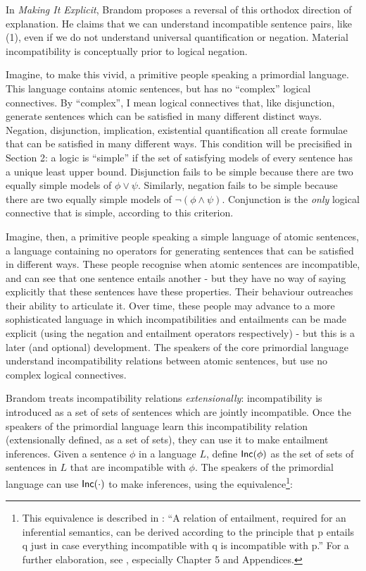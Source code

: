 \NI In \emph{Making It Explicit}\cite{brandom2}, Brandom proposes a reversal of this
orthodox direction of explanation.  He claims that we can understand
incompatible sentence pairs, like (1), even if we do not understand
universal quantification or negation.  Material incompatibility is
conceptually prior to logical negation.

\NI Imagine, to make this vivid, a primitive people speaking a
primordial language.  This language contains atomic sentences, but has
no ``complex'' logical connectives.  By ``complex'', I mean logical
connectives that, like disjunction, generate sentences which can be
satisfied in many different distinct ways.  Negation, disjunction,
implication, existential quantification all create formulae that can
be satisfied in many different ways. This condition will be
precisified in Section 2: a logic is ``simple'' if the set of
satisfying models of every sentence has a unique least upper
bound. Disjunction fails to be simple because there are two equally
simple models of $\phi \lor \psi$. Similarly, negation fails to be simple
because there are two equally simple models of $\neg (\phi \land
\psi)$. Conjunction is the \emph{only} logical connective that is simple,
according to this criterion.

\NI Imagine, then, a primitive people speaking a simple language of
atomic sentences, a language containing no operators for generating
sentences that can be satisfied in different ways.  These people
recognise when atomic sentences are incompatible, and can see that one
sentence entails another - but they have no way of saying explicitly
that these sentences have these properties.  Their behaviour
outreaches their ability to articulate it.  Over time, these people
may advance to a more sophisticated language in which
incompatibilities and entailments can be made explicit (using the
negation and entailment operators respectively) - but this is a later
(and optional) development. The speakers of the core primordial
language understand incompatibility relations between atomic
sentences, but use no complex logical connectives.

Brandom treats incompatibility relations \emph{extensionally}:
incompatibility is introduced as a set of sets of sentences which are
jointly incompatible.  Once the speakers of the primordial language
learn this incompatibility relation (extensionally defined, as a set
of sets), they can use it to make entailment inferences.  Given a
sentence $\phi$ in a language $L$, define $\mathsf{Inc}(\phi)$ as the set of sets of
sentences in $L$ that are incompatible with $\phi$.  The speakers of the
primordial language can use $\mathsf{Inc}(\cdot)$ to make inferences, using the
equivalence\footnote{This equivalence is described in \cite{brandom2}:
  ``A relation of entailment, required for an inferential semantics,
  can be derived according to the principle that p entails q just in
  case everything incompatible with q is incompatible with p.'' For a
  further elaboration, see \cite{brandom}, especially Chapter 5 and
  Appendices.}:


